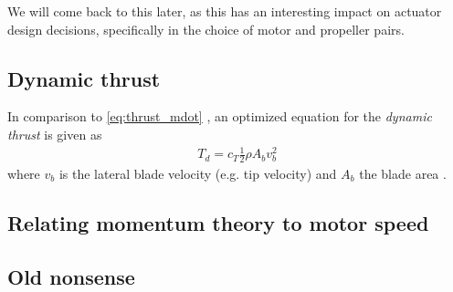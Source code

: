 
We will come back to this later, as this has an interesting impact on actuator design decisions, specifically in the choice of motor and propeller pairs.




\subsection{Dynamic thrust}

In comparison to \cref{eq:thrust_mdot} , an optimized equation for the \textit{dynamic thrust} is given as
%
\begin{align}
T_d = c_T \frac{1}{2} \rho A_b v_b^2
\end{align}
%
where $v_b$ is the lateral blade velocity (e.g. tip velocity) and $A_b$ the blade area \cite[chapter~1.6.3]{physing}.



\subsection{Relating momentum theory to motor speed}
\label{subsec:momentum_theory_to_motor}














\subsection{Old nonsense}


